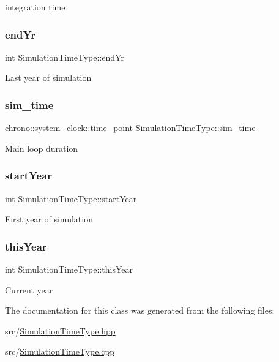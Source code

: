 integration time \mbox{\label{class_simulation_time_type_af6197accafaf26492d16804698769660}} 
\subsubsection{\texorpdfstring{end\+Yr}{endYr}}
{\footnotesize\ttfamily int Simulation\+Time\+Type\+::end\+Yr}

Last year of simulation \mbox{\label{class_simulation_time_type_a59eef0a521b5637639701bd7ad4fe73e}} 
\subsubsection{\texorpdfstring{sim\+\_\+time}{sim\_time}}
{\footnotesize\ttfamily chrono\+::system\+\_\+clock\+::time\+\_\+point Simulation\+Time\+Type\+::sim\+\_\+time}

Main loop duration \mbox{\label{class_simulation_time_type_aaa632d7b7d9a2373e0e0fa8fffbbe122}} 
\subsubsection{\texorpdfstring{start\+Year}{startYear}}
{\footnotesize\ttfamily int Simulation\+Time\+Type\+::start\+Year}

First year of simulation \mbox{\label{class_simulation_time_type_a1cd46f2a7b6924dec7aa98832a881c4e}} 
\subsubsection{\texorpdfstring{this\+Year}{thisYear}}
{\footnotesize\ttfamily int Simulation\+Time\+Type\+::this\+Year}

Current year 

The documentation for this class was generated from the following files\+:\begin{DoxyCompactItemize}
\item 
src/\mbox{\hyperlink{_simulation_time_type_8hpp}{Simulation\+Time\+Type.\+hpp}}\item 
src/\mbox{\hyperlink{_simulation_time_type_8cpp}{Simulation\+Time\+Type.\+cpp}}\end{DoxyCompactItemize}
